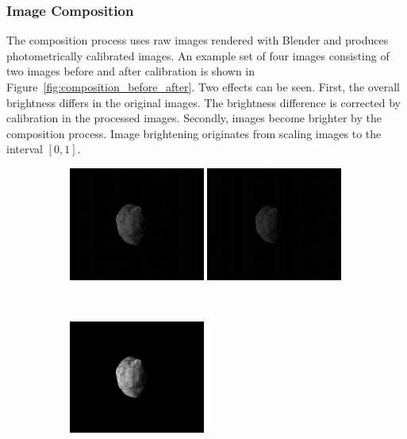 \subsubsection{Image Composition}
The composition process uses raw images rendered with Blender and produces photometrically calibrated images. An example set of four images consisting of two images before and after calibration is shown in Figure~\ref{fig:composition_before_after}. Two effects can be seen. First, the overall brightness differs in the original images. The brightness difference is corrected by calibration in the processed images. Secondly, images become brighter by the composition process. Image brightening originates from scaling images to the interval $[0,1]$.

\begin{figure}[htb]
    \centering
    \begin{subfigure}[b]{\textwidth}
        \centering
        \includegraphics[width=0.49\textwidth]{doc/thesis/0_figures/rendering_lighting/SssbOnly_2017-08-15T115858-281000.jpg}
        \includegraphics[width=0.49\textwidth]{doc/thesis/0_figures/rendering_lighting/SssbOnly_2017-08-15T115859-288000.jpg}
    \end{subfigure}
    \\
    \begin{subfigure}[b]{\textwidth}
        \centering
        \includegraphics[width=0.49\textwidth]{doc/thesis/0_figures/rendering_lighting/Inst_2017-08-15T115858-281000.png}

\end{subfigure}
\end{figure}
